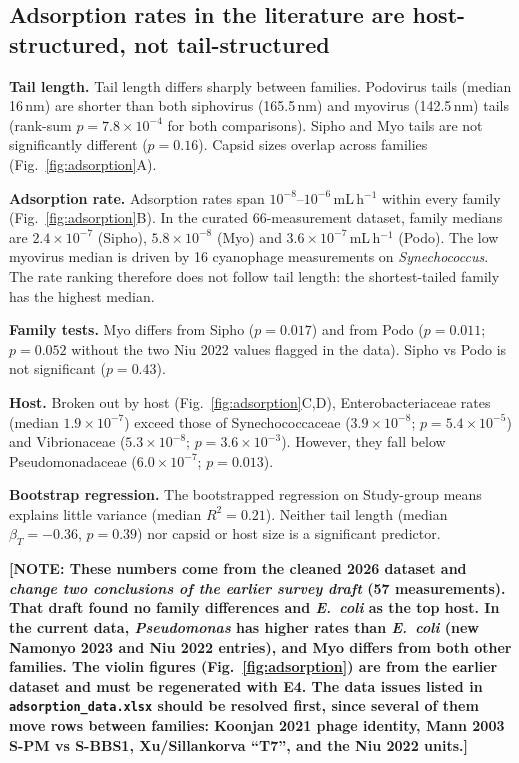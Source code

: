 \documentclass[12pt]{article}
\newcommand{\note}[1]{{\color{red}\textbf{[NOTE: #1]}}}
\begin{document}
\subsection*{Adsorption rates in the literature are host-structured, not tail-structured}
\textbf{Tail length.} Tail length differs sharply between families. Podovirus tails (median 16\,nm) are shorter than both siphovirus (165.5\,nm) and myovirus (142.5\,nm) tails (rank-sum $p=7.8\times10^{-4}$ for both comparisons). Sipho and Myo tails are not significantly different ($p=0.16$). Capsid sizes overlap across families (Fig.~\ref{fig:adsorption}A).

\textbf{Adsorption rate.} Adsorption rates span $10^{-8}$--$10^{-6}$\,mL\,h$^{-1}$ within every family (Fig.~\ref{fig:adsorption}B). In the curated 66-measurement dataset, family medians are $2.4\times10^{-7}$ (Sipho), $5.8\times10^{-8}$ (Myo) and $3.6\times10^{-7}$\,mL\,h$^{-1}$ (Podo). The low myovirus median is driven by 16 cyanophage measurements on \textit{Synechococcus}. The rate ranking therefore does not follow tail length: the shortest-tailed family has the highest median.

\textbf{Family tests.} Myo differs from Sipho ($p=0.017$) and from Podo ($p=0.011$; $p=0.052$ without the two Niu 2022 values flagged in the data). Sipho vs Podo is not significant ($p=0.43$).

\textbf{Host.} Broken out by host (Fig.~\ref{fig:adsorption}C,D), Enterobacteriaceae rates (median $1.9\times10^{-7}$) exceed those of Synechococcaceae ($3.9\times10^{-8}$; $p=5.4\times10^{-5}$) and Vibrionaceae ($5.3\times10^{-8}$; $p=3.6\times10^{-3}$). However, they fall below Pseudomonadaceae ($6.0\times10^{-7}$; $p=0.013$).

\textbf{Bootstrap regression.} The bootstrapped regression on Study-group means explains little variance (median $R^2=0.21$). Neither tail length (median $\beta_T=-0.36$, $p=0.39$) nor capsid or host size is a significant predictor.

\note{These numbers come from the cleaned 2026 dataset and \emph{change two conclusions of the earlier survey draft} (57 measurements). That draft found no family differences and \textit{E.~coli} as the top host. In the current data, \textit{Pseudomonas} has higher rates than \textit{E.~coli} (new Namonyo 2023 and Niu 2022 entries), and Myo differs from both other families. The violin figures (Fig.~\ref{fig:adsorption}) are from the earlier dataset and must be regenerated with E4. The data issues listed in \texttt{adsorption\_data.xlsx} should be resolved first, since several of them move rows between families: Koonjan 2021 phage identity, Mann 2003 S-PM vs S-BBS1, Xu/Sillankorva ``T7'', and the Niu 2022 units.}
\end{document}

